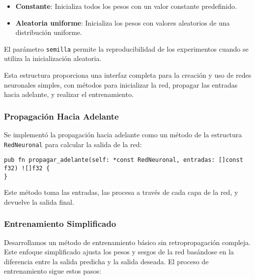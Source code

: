 \documentclass[twocolumn]{article}
\begin{document}
\begin{itemize}
    \item \textbf{Constante}: Inicializa todos los pesos con un valor constante predefinido.
    \item \textbf{Aleatoria uniforme}: Inicializa los pesos con valores aleatorios de una distribución uniforme.
\end{itemize}
El parámetro \texttt{semilla} permite la reproducibilidad de los experimentos cuando se utiliza la inicialización aleatoria.

Esta estructura proporciona una interfaz completa para la creación y uso de redes neuronales simples, con métodos para inicializar la red, propagar las entradas hacia adelante, y realizar el entrenamiento.

\subsubsection*{Propagación Hacia Adelante}
Se implementó la propagación hacia adelante como un método de la estructura \texttt{RedNeuronal} para calcular la salida de la red:

\begin{lstlisting}[style=customcode]
pub fn propagar_adelante(self: *const RedNeuronal, entradas: []const f32) ![]f32 {
}
\end{lstlisting}

Este método toma las entradas, las procesa a través de cada capa de la red, y devuelve la salida final.

\subsubsection*{Entrenamiento Simplificado}
Desarrollamos un método de entrenamiento básico sin retropropagación compleja. Este enfoque simplificado ajusta los pesos y sesgos de la red basándose en la diferencia entre la salida predicha y la salida deseada. El proceso de entrenamiento sigue estos pasos:
\end{document}
